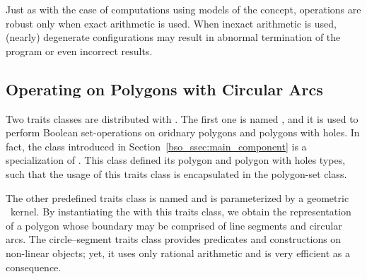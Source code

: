 Just as with the case of computations using models of the 
 concept, operations are robust only
when exact arithmetic is used. When inexact arithmetic is used,
(nearly) degenerate configurations may result in abnormal termination
of the program or even incorrect results.

\subsection{Operating on Polygons with Circular Arcs}
\label{bso_ssec:circ_seg}

Two traits classes are distributed with \cgal. The first one is named
, and it is used to perform Boolean
set-operations on oridnary polygons and polygons with holes. In fact,
the class  introduced in
Section~\ref{bso_ssec:main_component} is a specialization of
. This class defined
its polygon and polygon with holes types, such that the usage of this
traits class is encapsulated in the polygon-set class.

The other predefined traits class is named 
 and is parameterized by a
geometric \cgal\ kernel. By instantiating the 
with this traits class, we obtain the representation of a polygon whose
boundary may be comprised of line segments and circular arcs.
The circle--segment traits class provides predicates and constructions
on non-linear objects; yet, it uses only rational arithmetic and is
very efficient as a consequence.

